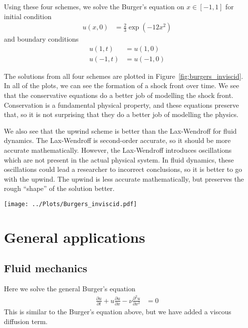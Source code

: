 \documentclass[twocolumn]{myarticle}
\begin{document}
Using these four schemes, we solve the Burger's equation on $ x \in [-1, 1] $ for initial condition
\begin{align}
    u(x, 0) &= \frac{2}{3} \exp \left( - 12 x^2 \right)
\end{align}
and boundary conditions
\begin{align}
    u(1, t) &= u(1, 0)
    \\
    u(-1, t) &= u(-1, 0)
\end{align}

The solutions from all four schemes are plotted in Figure~\ref{fig:burgers_inviscid}.
In all of the plots, we can see the formation of a shock front over time.
We see that the conservative equations do a better job of modelling the shock front.
Conservation is a fundamental physical property, and these equations preserve that, so it is not surprising that they do a better job of modelling the physics.

We also see that the upwind scheme is better than the Lax-Wendroff for fluid dynamics.
The Lax-Wendroff is second-order accurate, so it should be more accurate mathematically.
However, the Lax-Wendroff introduces oscillations which are not present in the actual physical system.
In fluid dynamics, these oscillations could lead a researcher to incorrect conclusions, so it is better to go with the upwind.
The upwind is less accurate mathematically, but preserves the rough ``shape'' of the solution better.

\begin{figure*}[ht]
    \centering
    \texttt{[image: ../Plots/Burgers\_inviscid.pdf]}
    \caption{Solutions to the inviscid Burger's equation with different numerical schemes.}
    \label{fig:burgers_inviscid}
\end{figure*}

\section{General applications}
\label{sec:general_applications}

\subsection{Fluid mechanics}
\label{subsec:fluid_mechanics}

Here we solve the general Burger's equation
\begin{align}
    \frac{\partial u}{\partial t} + u \frac{\partial u}{\partial x} - \nu \frac{\partial^2 u}{\partial x^2} &= 0
\end{align}
This is similar to the Burger's equation above, but we have added a viscous diffusion term.
\end{document}
